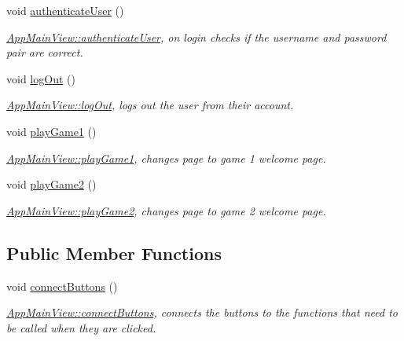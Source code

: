 \begin{DoxyCompactItemize}
\mbox{\label{classAppMainView_abea602fb374e111e5e14007a96e651e8}} 
void \hyperlink{classAppMainView_abea602fb374e111e5e14007a96e651e8}{authenticate\+User} ()
\begin{DoxyCompactList}\small\item\em \hyperlink{classAppMainView_abea602fb374e111e5e14007a96e651e8}{App\+Main\+View\+::authenticate\+User}, on login checks if the username and password pair are correct. \end{DoxyCompactList}\item 
\mbox{\label{classAppMainView_aba3b2431f4395525e73ef0314b16c8ff}} 
void \hyperlink{classAppMainView_aba3b2431f4395525e73ef0314b16c8ff}{log\+Out} ()
\begin{DoxyCompactList}\small\item\em \hyperlink{classAppMainView_aba3b2431f4395525e73ef0314b16c8ff}{App\+Main\+View\+::log\+Out}, logs out the user from their account. \end{DoxyCompactList}\item 
\mbox{\label{classAppMainView_ab08130551b14f168d2b927872b3530f4}} 
void \hyperlink{classAppMainView_ab08130551b14f168d2b927872b3530f4}{play\+Game1} ()
\begin{DoxyCompactList}\small\item\em \hyperlink{classAppMainView_ab08130551b14f168d2b927872b3530f4}{App\+Main\+View\+::play\+Game1}, changes page to game 1 welcome page. \end{DoxyCompactList}\item 
\mbox{\label{classAppMainView_ae73887df8b33fe982ff9daa0a5449358}} 
void \hyperlink{classAppMainView_ae73887df8b33fe982ff9daa0a5449358}{play\+Game2} ()
\begin{DoxyCompactList}\small\item\em \hyperlink{classAppMainView_ae73887df8b33fe982ff9daa0a5449358}{App\+Main\+View\+::play\+Game2}, changes page to game 2 welcome page. \end{DoxyCompactList}\end{DoxyCompactItemize}
\subsection*{Public Member Functions}
\begin{DoxyCompactItemize}
\item 
\mbox{\label{classAppMainView_af0d3cdcecdf8f7b717cce0f9803d85c9}} 
void \hyperlink{classAppMainView_af0d3cdcecdf8f7b717cce0f9803d85c9}{connect\+Buttons} ()
\begin{DoxyCompactList}\small\item\em \hyperlink{classAppMainView_af0d3cdcecdf8f7b717cce0f9803d85c9}{App\+Main\+View\+::connect\+Buttons}, connects the buttons to the functions that need to be called when they are clicked. \end{DoxyCompactList}\end{DoxyCompactItemize}

